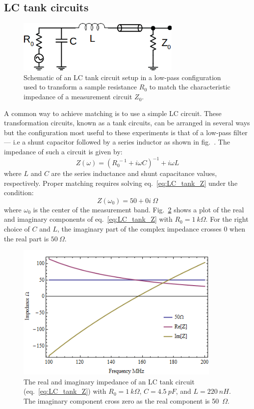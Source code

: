 \subsection{LC tank circuits}
\begin{figure}
\centering
\includegraphics[width=80mm]{figures/Johnson_noise_thermometry/schematic_matching.png}
\caption{Schematic of an LC tank circuit setup in a low-pass configuration used to transform a sample resistance $R_0$ to match the characteristic impedance of a measurement circuit $Z_0$.}
\label{fig:schematic_matching}
\end{figure}
A common way to achieve matching is to use a simple LC circuit. These transformation circuits, known as a tank circuits, can be arranged in several ways but the configuration most useful to these experiments is that of a low-pass filter --- i.e a shunt capacitor followed by a series inductor as shown in fig.~\cite{fig:schematic_matching}. The impedance of such a circuit is given by:
\begin{equation}\label{eq:LC_tank_Z}
Z(\omega) = \left(R_0^{~-1}+i\omega C\right)^{-1}+i\omega L
\end{equation}
where $L$ and $C$ are the series inductance and shunt capacitance values, respectively. Proper matching requires solving eq.~\ref{eq:LC_tank_Z} under the condition:
\begin{equation}\label{eq:LC_tank_constraint}
Z(\omega_0) = 50+0i~\Omega 
\end{equation}
where $\omega_0$ is the center of the measurement band. Fig.~\ref{fig:LC_tank_Z} shows a plot of the real and imaginary components of eq.~\ref{eq:LC_tank_Z} with $R_0 = 1~k\Omega$. For the right choice of $C$ and $L$, the imaginary part of the complex impedance crosses $0$ when the real part is $50~\Omega$.
\begin{figure}
\centering
\includegraphics[width=100mm]{figures/Johnson_noise_thermometry/Impedance_matching2.png}
\caption{The real and imaginary impedance of an LC tank circuit (eq.~\ref{eq:LC_tank_Z}) with $R_0=1~k\Omega$, $C = 4.5~pF$, and $L = 220~nH$. The imaginary component cross zero as the real component is 50~$\Omega$.}
\label{fig:LC_tank_Z}
\end{figure}
